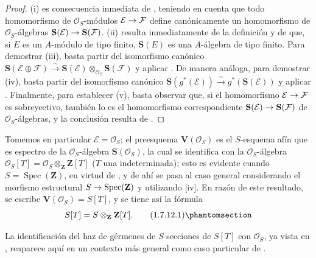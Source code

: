 \documentclass[oneside,10pt]{amsart}
\makeatletter
\newcommand{\ega@arrow}[2]{\mathchoice{#1}{#2}{#2}{#2}}
\renewcommand{\to}{\ega@arrow{\longrightarrow}{\rightarrow}}
\newcommand{\oldpage}[2][]{\marginnote{\normalfont\footnotesize\textbf{#1}~|~#2}\ignorespaces}
\let\EGAOriginalLabel\label
\renewcommand{\label}[1]{\phantomsection\EGAOriginalLabel{#1}}
\makeatother
\begin{document}
\begin{proof}
(i) es consecuencia inmediata de , teniendo en cuenta que todo homomorfismo de $\mathcal{O}_S$-módulos $\mathcal{E}\to\mathcal{F}$ define canónicamente un homomorfismo de $\mathcal{O}_S$-álgebras $\mathbf{S}(\mathcal{E})\to\mathbf{S}(\mathcal{F})$.
(ii) resulta inmediatamente de la definición  y de que, si $E$ es un $A$-módulo de tipo finito, $\mathbf{S}(E)$ es una $A$-álgebra de tipo finito.
Para demostrar (iii), basta partir del isomorfismo canónico $\mathbf{S}(\mathcal{E}\oplus\mathcal{F})
\xrightarrow{\sim}\mathbf{S}(\mathcal{E})
\otimes_{\mathcal{O}_S}\mathbf{S}(\mathcal{F})$  y aplicar .
De manera análoga, para demostrar (iv), basta partir del isomorfismo canónico $\mathbf{S}(g^*(\mathcal{E}))
\xrightarrow{\sim} g^*(\mathbf{S}(\mathcal{E}))$  y aplicar .
Finalmente, para establecer (v), basta observar que, si el homomorfismo $\mathcal{E}\to\mathcal{F}$ es sobreyectivo, también lo es el homomorfismo correspondiente $\mathbf{S}(\mathcal{E})\to\mathbf{S}(\mathcal{F})$ de $\mathcal{O}_S$-álgebras, y la conclusión resulta de .
\end{proof}

\begin{env}[1.7.12]
\label{II.1.7.12-fr}
Tomemos en particular $\mathcal{E}=\mathcal{O}_S$; el preesquema $\mathbf{V}(\mathcal{O}_S)$ es el $S$-esquema afín que es espectro de la $\mathcal{O}_S$-álgebra $\mathbf{S}(\mathcal{O}_S)$, la cual se identifica con la $\mathcal{O}_S$-álgebra $\mathcal{O}_S[T]=\mathcal{O}_S\otimes_{\mathbf{Z}}\mathbf{Z}[T]$
\oldpage[II]{18}
($T$ una indeterminada); esto es evidente cuando $S=\operatorname{Spec}(\mathbf{Z})$, en virtud de , y de ahí se pasa al caso general considerando el morfismo estructural $S\to\operatorname{Spec}(\mathbf{Z})$ y utilizando [iv].
En razón de este resultado, se escribe $\mathbf{V}(\mathcal{O}_S)=S[T]$, y se tiene así la fórmula
\[
  S[T]=S\otimes_{\mathbf{Z}}\mathbf{Z}[T].
  \tag{1.7.12.1}\label{II.1.7.12.1-fr}
\]

La identificación del haz de gérmenes de $S$-secciones de $S[T]$ con $\mathcal{O}_S$, ya vista en , reaparece aquí en un contexto más general como caso particular de .
\end{env}
\end{document}
